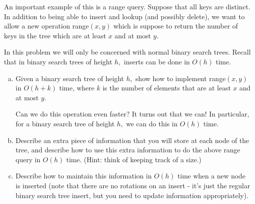 \documentclass{article}
\begin{document}
An important example of this is a range query. Suppose that all keys are distinct. In addition to being able to insert and lookup (and possibly delete), we want to allow a new operation range$(x, y)$ which is suppose to return the number of keys in the tree which are at least $x$ and at most $y.$

In this problem we will only be concerned with normal binary search trees. Recall that in binary search trees of height $h,$ inserts can be done in $O(h)$ time.
\begin{enumerate}[(a)]
	\item Given a binary search tree of height $h,$ show how to implement range$(x, y)$ in $O(h+k)$ time, where $k$ is the number of elements that are at least $x$ and at most $y.$

	Can we do this operation even faster? It turns out that we can! In particular, for a binary search tree of height $h,$ we can do this in $O(h)$ time. 

	\item Describe an extra piece of information that you will store at each node of the tree, and describe how to use this extra information to do the above range query in $O(h)$ time. (Hint: think of keeping track of a size.)

	\item Describe how to maintain this information in $O(h)$ time when a new node is inserted (note that there are no rotations on an insert - it's just the regular binary search tree insert, but you need to update information appropriately).
		
\end{enumerate}
\end{document}
